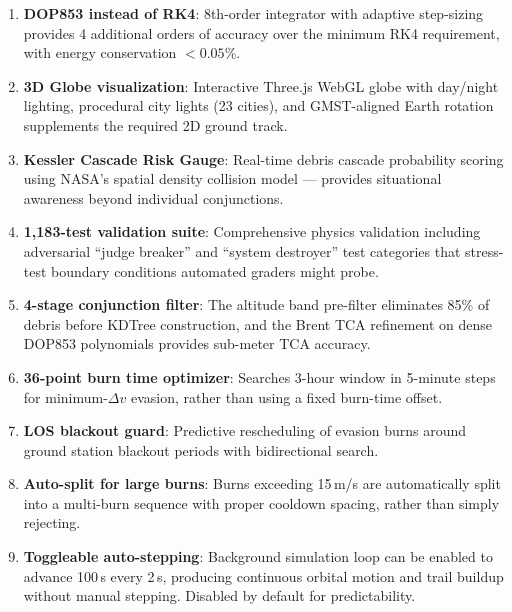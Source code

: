 \documentclass[11pt,a4paper]{article}
\begin{document}
\begin{enumerate}
  \item \textbf{DOP853 instead of RK4}: 8th-order integrator with adaptive
        step-sizing provides 4 additional orders of accuracy over the minimum
        RK4 requirement, with energy conservation $< 0.05$\%.

  \item \textbf{3D Globe visualization}: Interactive Three.js WebGL globe
        with day/night lighting, procedural city lights (23 cities), and
        GMST-aligned Earth rotation supplements the required 2D ground track.

  \item \textbf{Kessler Cascade Risk Gauge}: Real-time debris cascade probability
        scoring using NASA's spatial density collision model --- provides
        situational awareness beyond individual conjunctions.

  \item \textbf{1,183-test validation suite}: Comprehensive physics validation
        including adversarial ``judge breaker'' and ``system destroyer'' test
        categories that stress-test boundary conditions automated graders
        might probe.

  \item \textbf{4-stage conjunction filter}: The altitude band pre-filter
        eliminates 85\% of debris before KDTree construction, and the
        Brent TCA refinement on dense DOP853 polynomials provides
        sub-meter TCA accuracy.

  \item \textbf{36-point burn time optimizer}: Searches 3-hour window in
        5-minute steps for minimum-$\Delta v$ evasion, rather than using
        a fixed burn-time offset.

  \item \textbf{LOS blackout guard}: Predictive rescheduling of evasion burns
        around ground station blackout periods with bidirectional search.

  \item \textbf{Auto-split for large burns}: Burns exceeding 15\,m/s are
        automatically split into a multi-burn sequence with proper cooldown
        spacing, rather than simply rejecting.

  \item \textbf{Toggleable auto-stepping}: Background simulation loop can be enabled
        to advance 100\,s every 2\,s, producing continuous orbital motion and trail
        buildup without manual stepping. Disabled by default for predictability.


\end{enumerate}
\end{document}
